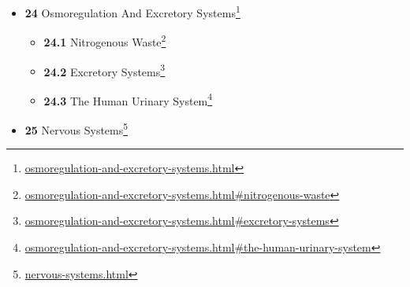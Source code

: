 \documentclass[
]{article}
\providecommand{\tightlist}{%
  \setlength{\itemsep}{0pt}\setlength{\parskip}{0pt}}
\providecommand{\tightlist}{%
  \setlength{\itemsep}{0pt}\setlength{\parskip}{0pt}}
\let\rmarkdownfootnote\footnote%
\def\footnote{\protect\rmarkdownfootnote}
\renewcommand{\href}[2]{#2\footnote{\url{#1}}}
\theoremstyle{definition}
\theoremstyle{definition}
\theoremstyle{definition}
\theoremstyle{remark}
\begin{document}
\begin{itemize}
\begin{itemize}
\begin{itemize}
{      Fat Digestion}
    \item
      \href{digestive-systems.html\#carbohydrate-digestion}{\emph{}\textbf{23.1.18}
      Carbohydrate Digestion}
    \item
      \href{digestive-systems.html\#dna-and-rna-digestion}{\emph{}\textbf{23.1.19}
      DNA And RNA Digestion}
    \item
      \href{digestive-systems.html\#non-destructive-digestion}{\emph{}\textbf{23.1.20}
      Non-destructive digestion}
    \item
      \href{digestive-systems.html\#the-digestive-system-of-birds}{\emph{}\textbf{23.1.21}
      The Digestive System of Birds}
    \end{itemize}
  \item
    \href{digestive-systems.html\#the-digestive-system-of-fish}{\emph{}\textbf{23.2}
    The Digestive System of Fish}
  \item
    \href{digestive-systems.html\#the-digestive-system-of-annelids}{\emph{}\textbf{23.3}
    The Digestive System of Annelids}
  \end{itemize}
\item
  \href{osmoregulation-and-excretory-systems.html}{\emph{}\textbf{24}
  Osmoregulation And Excretory Systems}

  \begin{itemize}
  \tightlist
  \item
    \href{osmoregulation-and-excretory-systems.html\#nitrogenous-waste}{\emph{}\textbf{24.1}
    Nitrogenous Waste}
  \item
    \href{osmoregulation-and-excretory-systems.html\#excretory-systems}{\emph{}\textbf{24.2}
    Excretory Systems}
  \item
    \href{osmoregulation-and-excretory-systems.html\#the-human-urinary-system}{\emph{}\textbf{24.3}
    The Human Urinary System}
  \end{itemize}
\item
  \href{nervous-systems.html}{\emph{}\textbf{25} Nervous Systems}


\end{itemize}
\end{document}
